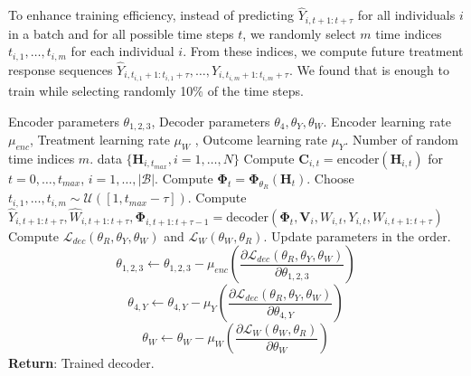 \documentclass{article}
\theoremstyle{plain}
\theoremstyle{definition}
\theoremstyle{remark}
\begin{document}
To enhance training efficiency, instead of predicting $\hat{Y}_{i,t+1:t+\tau}$ for all individuals $i$ in a batch and for all possible time steps $t$, we randomly select $m$ time indices $t_{i,1}, \dots, t_{i,m}$ for each individual $i$. From these indices, we compute future treatment response sequences $\hat{Y}_{i,t_{i,1}+1:t_{i,1}+\tau}, \dots, \hat{Y}_{i,t_{i,m}+1:t_{i,m}+\tau}$.  We found that is enough to train while selecting randomly 10\% of the time steps.

\begin{algorithm}%
   \caption{Training of the decoder}
   \label{alg: dec_training}
\begin{algorithmic}
   \REQUIRE Encoder parameters $\theta_{1,2,3}$, Decoder parameters $\theta_{4}, \theta_{Y}, \theta_{W}$.
    \REQUIRE Encoder learning rate $\mu_{enc}$, Treatment learning rate $\mu_{W}$ ,  Outcome learning rate $\mu_{Y}$.
    \REQUIRE Number of random time indices $m$.
    data $\{\mathbf{H}_{i, t_{max}}, i=1,\dots, N \}$ 
                    \STATE Compute $\mathbf{C}_{i, t} = \mathrm{encoder}(\mathbf{H}_{i, t})$ for $t=0, \dots, t_{max}$, $i=1,\dots, |\mathcal{B}| $.
                    \STATE Compute $\mathbf{\Phi}_t = \mathbf{\Phi}_{\theta_R}(\mathbf{H}_t)$.
                            \STATE Choose $t_{i,1}, \dots, t_{i,m} \sim \mathcal{U}([1, t_{max}-\tau]) $.
                                    \STATE Compute $\hat{Y}_{i,t+1:t+\tau}, \hat{W}_{i,t+1:t+\tau}, \mathbf{\Phi}_{i,t+1:t+\tau-1} = \mathrm{decoder}(\mathbf{\Phi}_t, \mathbf{V}_i, W_{i,t}, Y_{i,t}, W_{i,t+1:t+\tau}) $
                            \ENDFOR
                    \ENDFOR
                    \STATE Compute  $\mathcal{L}_{dec}(\theta_{R}, \theta_{Y}, \theta_{W})$ and $\mathcal{L}_{W}(\theta_{W}, \theta_{R})$.
                    \STATE Update parameters in the order.
                    $$\theta_{1,2,3} \leftarrow  \theta_{1,2,3} - \mu_{enc}  \left( \frac{\partial \mathcal{L}_{dec}(\theta_{R}, \theta_{Y}, \theta_{W})}{\partial \theta_{1,2,3} }\right  ) $$
                    $$\theta_{4, Y} \leftarrow  \theta_{4, Y}  - \mu_{Y}  \left( \frac{\partial \mathcal{L}_{dec}(\theta_{R}, \theta_{Y}, \theta_{W})}{\partial \theta_{4, Y}  }\right  ) $$                     $$\theta_{W} \leftarrow  \theta_{W}  - \mu_{W}  \left( \frac{\partial  \mathcal{L}_{W}(\theta_{W}, \theta_{R}) }{\partial \theta_{W} }\right  ) $$
            \ENDFOR
    \ENDFOR
   \STATE \textbf{Return}: Trained decoder.
\end{algorithmic}
\end{algorithm}
\end{document}
